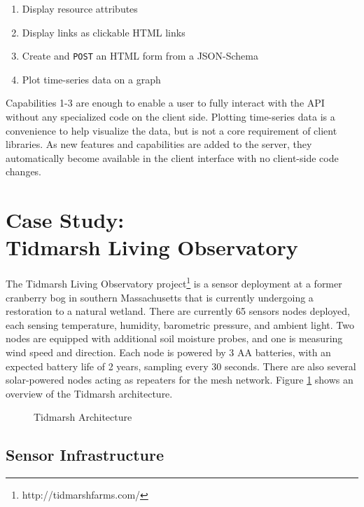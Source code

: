 \documentclass{acm_proc_article-sp}
\newenvironment{tightenumerate}{
    \vspace{-10pt}
    \begin{enumerate}
        \setlength{\parskip}{-1pt}}{
    \end{enumerate}
    \vspace{-10pt}}
\begin{document}
\begin{tightenumerate}
    \item Display resource attributes
    \item Display links as clickable HTML links
    \item Create and \texttt{POST} an HTML form from a JSON-Schema
    \item Plot time-series data on a graph
\end{tightenumerate}

Capabilities 1-3 are enough to enable a user to fully interact with the API
without any specialized code on the client side. Plotting time-series data is a
convenience to help visualize the data, but is not a core requirement of client
libraries. As new features and capabilities are added to the server, they
automatically become available in the client interface with no client-side code
changes.

\section{Case Study:\\Tidmarsh Living Observatory}

The Tidmarsh Living Observatory project\footnote{http://tidmarshfarms.com/} is
a sensor deployment at a former cranberry bog in southern Massachusetts that is
currently undergoing a restoration to a natural wetland. There are currently 65
sensors nodes deployed, each sensing temperature, humidity, barometric
pressure, and ambient light. Two nodes are equipped with additional soil
moisture probes, and one is measuring wind speed and direction. Each node is
powered by 3 AA batteries, with an expected battery life of 2 years, sampling
every 30 seconds. There are also several solar-powered nodes acting as
repeaters for the mesh network. Figure \ref{tidmarsh_arch} shows an overview of
the Tidmarsh architecture.

\begin{figure}
    \centering
    
    \caption{Tidmarsh Architecture}
    \label{tidmarsh_arch}
\end{figure}

\subsection{Sensor Infrastructure}
\end{document}
